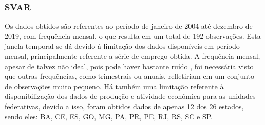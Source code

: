 \subsubsection{SVAR}
Os dados obtidos são referentes ao período de janeiro de 2004 até dezembro de 2019, com frequência mensal, o que resulta em um total de 192 observações. Esta janela temporal se dá devido à limitação dos dados disponíveis em período mensal, principalmente referente a série de emprego obtida. A frequência mensal, apesar de talvez não ideal, pois pode haver bastante ruído \cite{barboza2018efeitos}, foi necessária visto que outras frequências, como trimestrais ou anuais, refletiriam em um conjunto de observações muito pequeno. Há também uma limitação referente à disponibilização dos dados de produção e atividade econômica para as unidades federativas, devido a isso, foram obtidos dados de apenas 12 dos 26 estados, sendo eles: \gls{BA}, \gls{CE}, \gls{ES}, \gls{GO}, \gls{MG}, \gls{PA}, \gls{PR}, \gls{PE}, \gls{RJ}, \gls{RS}, \gls{SC} e \gls{SP}. 
\par

